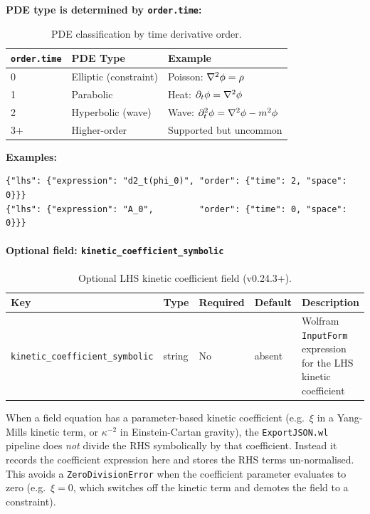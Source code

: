 \textbf{PDE type is determined by \texttt{order.time}:}

\begin{table}[htbp]
\centering
\caption{PDE classification by time derivative order.}
\label{tab:json-pde-type}
\begin{tabular}{@{}lll@{}}
\toprule
\texttt{order.time} & PDE Type & Example \\
\midrule
0 & Elliptic (constraint) & Poisson: $\nabla^2 \phi = \rho$ \\
1 & Parabolic             & Heat: $\partial_t \phi = \nabla^2 \phi$ \\
2 & Hyperbolic (wave)     & Wave: $\partial_t^2 \phi = \nabla^2 \phi - m^2 \phi$ \\
3+ & Higher-order         & Supported but uncommon \\
\bottomrule
\end{tabular}
\end{table}

\textbf{Examples:}

\begin{lstlisting}[style=json]
{"lhs": {"expression": "d2_t(phi_0)", "order": {"time": 2, "space": 0}}}
{"lhs": {"expression": "A_0",         "order": {"time": 0, "space": 0}}}
\end{lstlisting}

\paragraph{Optional field: \texttt{kinetic\_coefficient\_symbolic}}
\label{sec:json-lhs-kinetic-coeff}

\begin{table}[htbp]
\centering
\caption{Optional LHS kinetic coefficient field (v0.24.3+).}
\label{tab:json-lhs-kinetic}
\begin{tabular}{@{}lllll@{}}
\toprule
Key & Type & Required & Default & Description \\
\midrule
\texttt{kinetic\_coefficient\_symbolic} & string & No & absent & Wolfram \texttt{InputForm} expression for the LHS kinetic coefficient \\
\bottomrule
\end{tabular}
\end{table}

When a field equation has a parameter-based kinetic coefficient (e.g.\ $\xi$ in a
Yang-Mills kinetic term, or $\kappa^{-2}$ in Einstein-Cartan gravity), the
\texttt{ExportJSON.wl} pipeline does \emph{not} divide the RHS symbolically by that
coefficient.  Instead it records the coefficient expression here and stores the RHS
terms un-normalised.  This avoids a \texttt{ZeroDivisionError} when the coefficient
parameter evaluates to zero (e.g.\ $\xi = 0$, which switches off the kinetic term
and demotes the field to a constraint).


